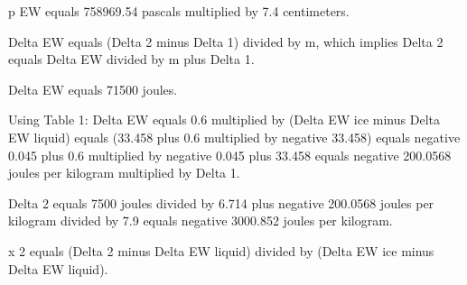 p EW equals 758969.54 pascals multiplied by 7.4 centimeters.

Delta EW equals (Delta 2 minus Delta 1) divided by m, which implies Delta 2 equals Delta EW divided by m plus Delta 1.

Delta EW equals 71500 joules.

Using Table 1:
Delta EW equals 0.6 multiplied by (Delta EW ice minus Delta EW liquid) equals (33.458 plus 0.6 multiplied by negative 33.458) equals negative 0.045 plus 0.6 multiplied by negative 0.045 plus 33.458 equals negative 200.0568 joules per kilogram multiplied by Delta 1.

Delta 2 equals 7500 joules divided by 6.714 plus negative 200.0568 joules per kilogram divided by 7.9 equals negative 3000.852 joules per kilogram.

x 2 equals (Delta 2 minus Delta EW liquid) divided by (Delta EW ice minus Delta EW liquid).